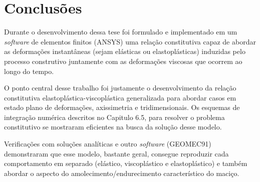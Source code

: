 \chapter{Conclusões}\label{Conclusoes}

Durante o desenvolvimento dessa tese foi formulado e implementado em um \textit{software} de elementos finitos (ANSYS) uma relação constitutiva capaz de abordar as deformações instantâneas (sejam elásticas ou elastoplásticas) induzidas pelo processo construtivo juntamente com as deformações viscosas que ocorrem ao longo do tempo. 

O ponto central desse trabalho foi justamente o desenvolvimento da relação constitutiva elastoplástica-viscoplástica generalizada para abordar casos em estado plano de deformações, axissimetria e tridimensionais. Os esquemas de integração numérica descritos no Capitulo 6.5, para resolver o problema constitutivo se mostraram eficientes na busca da solução desse modelo.

Verificações com soluções analíticas e outro \textit{software} (GEOMEC91) demonstraram que esse modelo, bastante geral, consegue reproduzir cada comportamento em separado (elástico, viscoplástico e elastoplástico) e também abordar o aspecto do amolecimento/endurecimento característico do maciço.